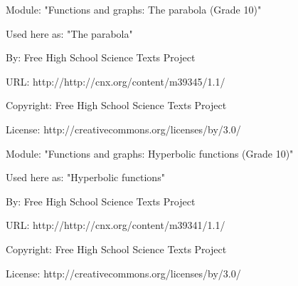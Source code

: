       \par\vspace{9pt}\noindent\begin{minipage}{\textwidth}
      Module: "Functions and graphs: The parabola (Grade 10)" \par\nopagebreak\noindent
      Used here as: "The parabola" \par\nopagebreak\noindent
        By: Free High School Science Texts Project\par\nopagebreak\noindent
      URL: http://http://cnx.org/content/m39345/1.1/\par\nopagebreak\noindent
      \par\nopagebreak\noindent
      Copyright: Free High School Science Texts Project\par\nopagebreak\noindent
      License:  http://creativecommons.org/licenses/by/3.0/\par\nopagebreak\noindent
      \par\end{minipage}
      \par\vspace{9pt}\noindent\begin{minipage}{\textwidth}
      Module: "Functions and graphs: Hyperbolic functions (Grade 10)" \par\nopagebreak\noindent
      Used here as: "Hyperbolic functions" \par\nopagebreak\noindent
        By: Free High School Science Texts Project\par\nopagebreak\noindent
      URL: http://http://cnx.org/content/m39341/1.1/\par\nopagebreak\noindent
      \par\nopagebreak\noindent
      Copyright: Free High School Science Texts Project\par\nopagebreak\noindent
      License:  http://creativecommons.org/licenses/by/3.0/\par\nopagebreak\noindent
      \par\end{minipage}
